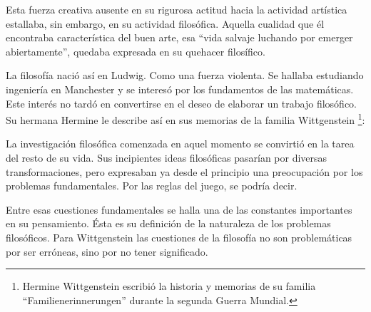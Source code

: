 Esta fuerza creativa ausente en su rigurosa actitud hacia la actividad artística
estallaba, sin embargo, en su actividad filosófica. Aquella cualidad que él
encontraba característica del buen arte, esa ``vida salvaje luchando por emerger
abiertamente'',\autocite[cf.˜][loc.˜]{monk1991duty} quedaba expresada en su
quehacer filosífico.

La filosofía nació así en Ludwig. Como una fuerza violenta. Se hallaba
estudiando ingeniería en Manchester y se interesó por los fundamentos de las
matemáticas. Este interés no tardó en convertirse en el deseo de elaborar un
trabajo filosófico. Su hermana Hermine le describe así en sus memorias de la
familia Wittgenstein
\footnote{Hermine Wittgenstein escribió la historia y memorias de su familia
  ``Familienerinnerungen'' durante la segunda Guerra Mundial.}:


La investigación filosófica comenzada en aquel momento se convirtió en la tarea
del resto de su vida. Sus incipientes ideas filosóficas pasarían por diversas
transformaciones, pero expresaban ya desde el principio una preocupación por los
problemas fundamentales. Por las reglas del juego, se podría decir.

Entre esas cuestiones fundamentales se halla una de las constantes importantes
en su pensamiento. Ésta es su definición de la naturaleza de los problemas
filosóficos. Para Wittgenstein las cuestiones de la filosofía no son
problemáticas por ser erróneas, sino por no tener
significado.\autocite[cf.~][4.003]{wittgenstein1922tractatus}

